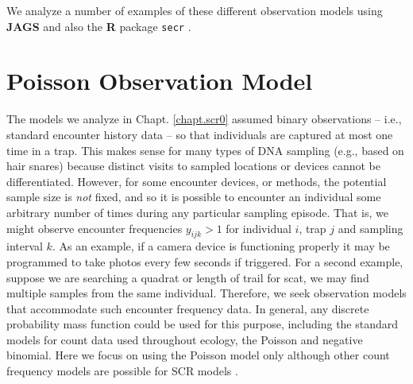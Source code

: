 We analyze a number of examples of these different observation models
using {\bf JAGS} and also the {\bf R}
package \mbox{\tt secr} \citep{efford:2011}.








\section{Poisson Observation Model}

The models we analyze in Chapt. \ref{chapt.scr0} assumed binary
observations -- i.e., standard encounter history data -- so
that individuals are captured at most one time in a trap.  This makes
sense for many types of DNA sampling (e.g., based on hair snares)
because distinct visits to sampled locations or devices cannot be
differentiated. However, for some encounter devices, or methods, the
potential sample size is {\it not} fixed, and so it is 
possible to encounter an individual some arbitrary number of times
during any particular sampling episode.
That is, we might observe
encounter frequencies $y_{ijk}>1$
for individual $i$, trap $j$ and
sampling interval $k$.  As an example, if a camera device is
functioning properly it may be programmed to take photos every few
seconds if triggered.  For a second example, suppose we are searching
a quadrat or length of trail for scat, we may find multiple samples from the same
individual.
Therefore, we seek observation models that accommodate such encounter
frequency data.  In general, any discrete probability mass function
could be used for this purpose, including the standard models for
count data used throughout ecology, the Poisson and negative
binomial.  Here we focus on using the Poisson
model only although other count frequency models are possible for SCR models 
\citep{efford_etal:2009ecol}.

